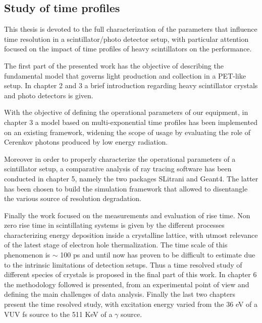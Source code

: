 \subsection{Study of time profiles}

This thesis is devoted to the full characterization of the parameters that influence time resolution in a scintillator/photo detector setup, with particular attention focused on the impact of time profiles of heavy scintillators on the performance.

The first part of the presented work has the objective of describing the fundamental model that governs light production and collection in a PET-like setup.
In chapter 2 and 3 a brief introduction regarding heavy scintillator crystals and photo detectors is given.

With the objective of defining the operational parameters of our equipment, in chapter 3 a model based on multi-exponential time profiles has been implemented on an existing framework, widening the scope of usage by evaluating the role of Cerenkov photons produced by low energy radiation.

Moreover in order to properly characterize the operational parameters of a scintillator setup, a comparative analysis of ray tracing software has been conducted in chapter 5, namely the two packages SLitrani and Geant4. The latter has been chosen to build the simulation framework that allowed to disentangle the various source of resolution degradation.

Finally the work focused on the measurements and evaluation of rise time. Non zero rise time in scintillating systems is given by the different processes characterizing energy deposition inside a crystalline lattice, with utmost relevance of the latest stage of electron hole thermalization. The time scale of this phenomenon is $\sim$ 100 ps and until now has proven to be difficult to estimate due to the intrinsic limitations of detection setups.
Thus a time resolved study of different species of crystals is proposed in the final part of this work.
In chapter 6 the methodology followed is presented, from an experimental point of view and defining the main challenges of data analysis.
Finally the last two chapters present the time resolved study, with excitation energy varied from the 36 eV of a VUV fs source to the 511 KeV of a $\gamma$ source. 




